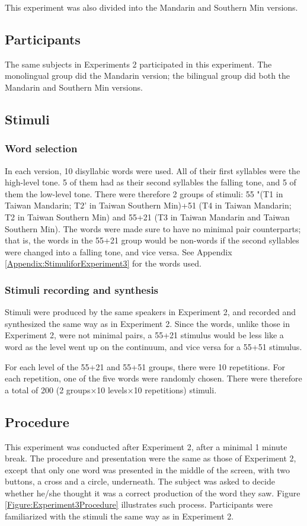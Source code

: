 This experiment was also divided into the Mandarin and Southern Min versions.

\subsection{Participants}
The same subjects in Experiments 2 participated in this experiment. The monolingual group did the Mandarin version; the bilingual group did both the Mandarin and Southern Min versions.

\subsection{Stimuli}
\subsubsection{Word selection} In each version, 10 disyllabic words were used. All of their first syllables were the high-level tone. 5 of them had as their second syllables the falling tone, and 5 of them the low-level tone. There were therefore 2 groups of stimuli: 55 "(T1 in Taiwan Mandarin; T2' in Taiwan Southern Min)+51 (T4 in Taiwan Mandarin; T2 in Taiwan Southern Min) and 55+21 (T3 in Taiwan Mandarin and Taiwan Southern Min). The words were made sure to have no minimal pair counterparts; that is, the words in the 55+21 group would be non-words if the second syllables were changed into a falling tone, and vice versa. See Appendix \ref{Appendix:StimuliforExperiment3} for the words used.

\subsubsection{Stimuli recording and synthesis}
Stimuli were produced by the same speakers in Experiment 2, and recorded and synthesized the same way as in Experiment 2. Since the words, unlike those in Experiment 2, were not minimal pairs, a 55+21 stimulus would be less like a word as the level went up on the continuum, and vice versa for a 55+51 stimulus.

For each level of the 55+21 and 55+51 groups, there were 10 repetitions. For each repetition, one of the five words were randomly chosen. There were therefore a total of 200 (2 groups$\times$10 levels$\times$10 repetitions) stimuli.

\subsection{Procedure}
This experiment was conducted after Experiment 2, after a minimal 1 minute break. The procedure and presentation were the same as those of Experiment 2, except that only one word was presented in the middle of the screen, with two buttons, a cross and a circle, underneath. The subject was asked to decide whether he/she thought it was a correct production of the word they saw. Figure \ref{Figure:Experiment3Procedure} illustrates such process. Participants were familiarized with the stimuli the same way as in Experiment 2.

